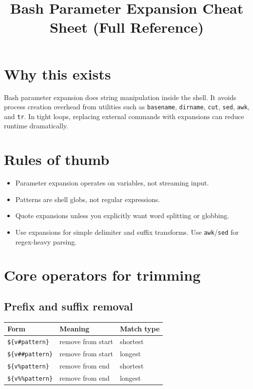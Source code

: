 \documentclass[11pt]{article}
\title{Bash Parameter Expansion Cheat Sheet (Full Reference)}
\author{}
\date{}
\begin{document}
\maketitle
\tableofcontents
\newpage

\section{Why this exists}
Bash parameter expansion does string manipulation inside the shell. It avoids process creation overhead from utilities such as
\texttt{basename}, \texttt{dirname}, \texttt{cut}, \texttt{sed}, \texttt{awk}, and \texttt{tr}.
In tight loops, replacing external commands with expansions can reduce runtime dramatically.

\section{Rules of thumb}
\begin{itemize}
\item Parameter expansion operates on variables, not streaming input.
\item Patterns are shell globs, not regular expressions.
\item Quote expansions unless you explicitly want word splitting or globbing.
\item Use expansions for simple delimiter and suffix transforms. Use \texttt{awk}/\texttt{sed} for regex-heavy parsing.
\end{itemize}

\section{Core operators for trimming}
\subsection{Prefix and suffix removal}
\begin{longtable}{lll}
\toprule
Form & Meaning & Match type \\
\midrule
\texttt{\$\{v\#pattern\}}   & remove from start & shortest \\
\texttt{\$\{v\#\#pattern\}} & remove from start & longest \\
\texttt{\$\{v\%pattern\}}   & remove from end   & shortest \\
\texttt{\$\{v\%\%pattern\}} & remove from end   & longest \\
\bottomrule
\end{longtable}
\end{document}
